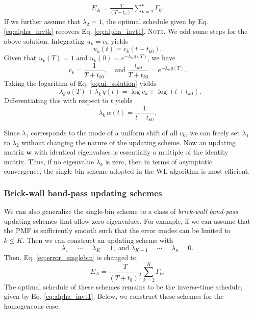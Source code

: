 \documentclass[reprint, floatfix]{revtex4-1}
\newcommand{\note}[1]{{\color{DarkGreen}\footnotesize \textsc{Note.} #1}}
\begin{document}
\begin{align}
  E_A
  =
  \frac{       T     }
       { (T + t_0)^2 }
  \sum_{ k = 2 }^n
    \Gamma_k
  .
\label{eq:error_singlebin}
\end{align}
%
If we further assume that $\lambda_2 = 1$,
the optimal schedule given by Eq. \eqref{eq:alpha_invtk}
recovers Eq. \eqref{eq:alpha_invt1}.
%
\note{We add some steps for the above solution.
  Integrating $\dot u_k = c_k$ yields
  \begin{equation}
  u_k(t) = c_k \left(t + t_{k0} \right).
  \label{eq:ui_solution}
  \end{equation}
  Given that $u_k(T) = 1$ and $u_k(0) = e^{-\lambda_k \, q(T)}$,
  we have
  $$
  c_k = \frac{ 1 }{ T + t_{k0} },
  \quad
  \mathrm{and\;}
  \frac{ t_{k0} } { T + t_{k0} }
  =
  e^{ -\lambda_k \, q(T) }.
  $$
  Taking the logarithm of Eq. \eqref{eq:ui_solution} yields
  $$
  -\lambda_k \, q(T) + \lambda_k \, q(t)
  = \log c_k + \log\left( t + t_{k0} \right).
  $$
  Differentiating this with respect to $t$ yields
  $$
  \lambda_k \, \alpha(t)
  =
  \frac {     1      }
        { t + t_{k0} }.
  $$
}

Since $\lambda_1$ corresponds to the mode
of a uniform shift of all $v_k$,
we can freely set $\lambda_1$ to $\lambda_2$
without changing the nature of the updating scheme.
%
Now an updating matrix $\mathbf w$
with identical eigenvalues
is essentially a multiple of the identity matrix.
%
Thus, if no eigenvalue $\lambda_k$ is zero,
then in terms of asymptotic convergence,
the single-bin scheme adopted in the WL algorithm
is most efficient.



\subsubsection{\label{sec:optscheme}
Brick-wall band-pass updating schemes}


We can also generalize
the single-bin scheme to a class of
\emph{brick-wall band-pass} updating schemes
that allow zero eigenvalues.
%
For example,
if we can assume that the PMF is sufficiently smooth
such that the error modes can be limited to $k \le K$.
%
Then we can construct an updating scheme with
$$
\lambda_1 = \cdots = \lambda_K = 1,
\mathrm{\; and \;}
\lambda_{K+1} = \cdots = \lambda_n = 0.
$$
%
Then,
Eq. \eqref{eq:error_singlebin} is changed to
%
\begin{equation}
  E_A
  =
  \frac {       T     }
        { (T + t_0)^2 }
  \sum_{ k = 2 }^K
    \Gamma_k.
\label{eq:error_asym_sinc}
\end{equation}
%
The optimal schedule of these schemes
remains to be the inverse-time schedule,
given by Eq. \eqref{eq:alpha_invt1}.
%
Below, we construct these schemes for
the homogeneous case.
\end{document}

